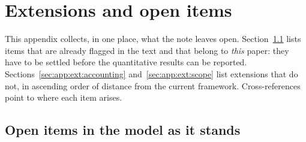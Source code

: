 \section{Extensions and open items}\label{sec:app:extensions}

This appendix collects, in one place, what the note leaves open. Section~\ref{sec:app:ext:open} lists
items that are already flagged in the text and that belong to \emph{this} paper: they have to be
settled before the quantitative results can be reported. Sections~\ref{sec:app:ext:accounting}
and~\ref{sec:app:ext:scope} list extensions that do not, in ascending order of distance from the
current framework. Cross-references point to where each item arises.

\subsection{Open items in the model as it stands}\label{sec:app:ext:open}

